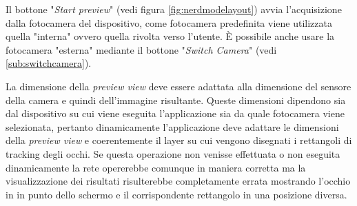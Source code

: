 Il bottone "\textit{Start preview}" (vedi figura \ref{fig:nerdmodelayout}) avvia l'acquisizione dalla fotocamera del dispositivo, come fotocamera predefinita viene utilizzata quella "interna" ovvero quella rivolta verso l'utente. È possibile anche usare la fotocamera "esterna" mediante il bottone "\textit{Switch Camera}" (vedi \ref{sub:switchcamera}).

La dimensione della \textit{preview view} deve essere adattata alla dimensione del sensore della camera e quindi dell'immagine risultante. Queste dimensioni dipendono sia dal dispositivo su cui viene eseguita l'applicazione sia da quale fotocamera viene selezionata, pertanto dinamicamente l'applicazione deve adattare le dimensioni della \textit{preview view} e coerentemente il layer su cui vengono disegnati i rettangoli di tracking degli occhi. Se questa operazione non venisse effettuata o non eseguita dinamicamente la rete opererebbe comunque in maniera corretta ma la visualizzazione dei risultati risulterebbe completamente errata mostrando l'occhio in in punto dello schermo e il corrispondente rettangolo in una posizione diversa.